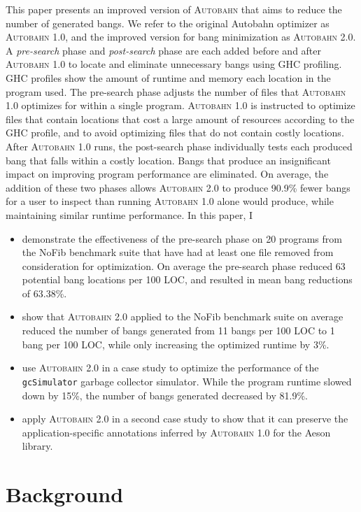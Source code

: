\documentclass[format=sigplan, review=true]{acmart}
\newcommand{\Ao}[0]{\textsc{Autobahn 1.0}}
\newcommand{\At}[0]{\textsc{Autobahn 2.0}}
\newcommand{\preopt}[0]{pre-search}
\newcommand{\postopt}[0]{post-search}
\begin{document}
This paper presents an improved version of \textsc{Autobahn} that aims to reduce the number of generated bangs. We refer to the original Autobahn optimizer as \Ao{}, and the improved version for bang minimization as \At{}. A \textit{\preopt{}} phase and \textit{\postopt{}} phase are each added before and after \Ao{} to locate and eliminate unnecessary bangs using GHC profiling. GHC profiles show the amount of runtime and memory each location in the program used. The \preopt{} phase adjusts the number of files that \Ao{} optimizes for within a single program. \Ao{} is instructed to optimize files that contain locations that cost a large amount of resources according to the GHC profile, and to avoid optimizing files that do not contain costly locations. After \Ao{} runs, the \postopt{} phase individually tests each produced bang that falls within a costly location. Bangs that produce an insignificant impact on improving program performance are eliminated. On average, the addition of these two phases allows \At{} to produce 90.9\% fewer bangs for a user to inspect than running \Ao{} alone would produce, while maintaining similar runtime performance. In this paper, I
\begin{itemize}
  \item demonstrate the effectiveness of the \preopt{} phase on 20 programs from the NoFib benchmark suite that have had at least one file removed from consideration for optimization. On average the \preopt{} phase reduced 63 potential bang locations per 100 LOC, and resulted in mean bang reductions of 63.38\%. 
  \item show that \At{} applied to the NoFib benchmark suite on average reduced the number of bangs generated from 11 bangs per 100 LOC to 1 bang per 100 LOC, while only increasing the optimized runtime by 3\%.
  \item use \At{} in a case study to optimize the performance of the \texttt{gcSimulator} garbage collector simulator. While the program runtime slowed down by 15\%, the number of bangs generated decreased by 81.9\%.
  \item apply \At{} in a second case study to show that it can preserve the application-specific annotations inferred by \Ao{} for the Aeson library. 
\end{itemize}


\section{Background}
\end{document}
